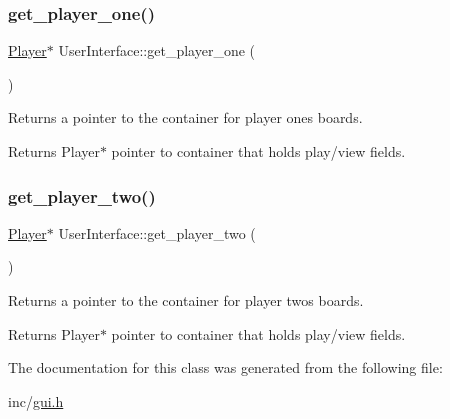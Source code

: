 \subsubsection{\texorpdfstring{get\_player\_one()}{get\_player\_one()}}
{\footnotesize\ttfamily \mbox{\hyperlink{classPlayer}{Player}}$\ast$ User\+Interface\+::get\+\_\+player\+\_\+one (\begin{DoxyParamCaption}{ }\end{DoxyParamCaption})}



Returns a pointer to the container for player one\textquotesingle{}s boards. 

\begin{DoxyReturn}{Returns}
Player$\ast$ pointer to container that holds play/view fields. 
\end{DoxyReturn}
\mbox{\label{classUserInterface_ac3c8fb7db84da49682117ae0ff140ea9}} 
\subsubsection{\texorpdfstring{get\_player\_two()}{get\_player\_two()}}
{\footnotesize\ttfamily \mbox{\hyperlink{classPlayer}{Player}}$\ast$ User\+Interface\+::get\+\_\+player\+\_\+two (\begin{DoxyParamCaption}{ }\end{DoxyParamCaption})}



Returns a pointer to the container for player two\textquotesingle{}s boards. 

\begin{DoxyReturn}{Returns}
Player$\ast$ pointer to container that holds play/view fields. 
\end{DoxyReturn}


The documentation for this class was generated from the following file\+:\begin{DoxyCompactItemize}
\item 
inc/\mbox{\hyperlink{gui_8h}{gui.\+h}}\end{DoxyCompactItemize}
